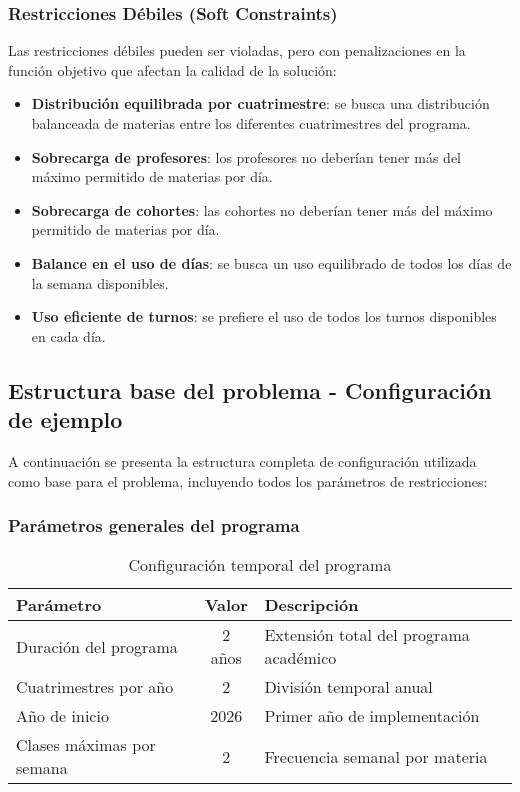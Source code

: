 \subsubsection{Restricciones Débiles (Soft Constraints)}
Las restricciones débiles pueden ser violadas, pero con penalizaciones en la función objetivo que afectan la calidad de la solución:

\begin{itemize}
    \item \textbf{Distribución equilibrada por cuatrimestre}: se busca una distribución balanceada de materias entre los diferentes cuatrimestres del programa.
    \item \textbf{Sobrecarga de profesores}: los profesores no deberían tener más del máximo permitido de materias por día.
    \item \textbf{Sobrecarga de cohortes}: las cohortes no deberían tener más del máximo permitido de materias por día.
    \item \textbf{Balance en el uso de días}: se busca un uso equilibrado de todos los días de la semana disponibles.
    \item \textbf{Uso eficiente de turnos}: se prefiere el uso de todos los turnos disponibles en cada día.
\end{itemize}

\subsection{Estructura base del problema - Configuración de ejemplo}
A continuación se presenta la estructura completa de configuración utilizada como base para el problema, incluyendo todos los parámetros de restricciones:

\subsubsection{Parámetros generales del programa}
\begin{table}[ht]
\centering
\begin{tabular}{|l|c|l|}
\hline
\textbf{Parámetro} & \textbf{Valor} & \textbf{Descripción} \\
\hline
Duración del programa & 2 años & Extensión total del programa académico \\
Cuatrimestres por año & 2 & División temporal anual \\
Año de inicio & 2026 & Primer año de implementación \\
Clases máximas por semana & 2 & Frecuencia semanal por materia \\
\hline
\end{tabular}
\caption{Configuración temporal del programa}
\end{table}

